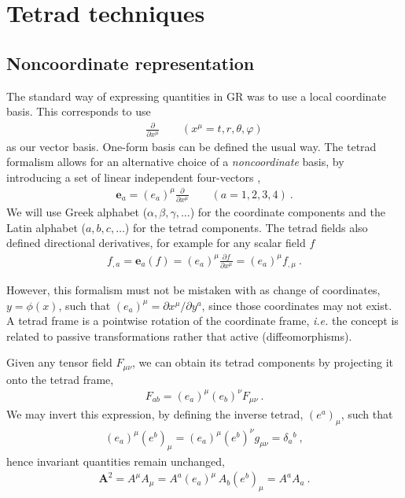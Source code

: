 
\chapter{Tetrad techniques} %
\label{AppendixTetradFormalism}


\section{Noncoordinate representation}
\label{AppendixTetradMetric}

The standard way of expressing quantities in GR was to use a local coordinate basis. This corresponds to use
\begin{align}
    \frac{\partial}{\partial x^\mu} \qquad (x^\mu = t, r, \theta, \varphi)
\end{align}
as our vector basis. One-form basis can be defined the usual way. The tetrad formalism allows for an alternative choice of a \emph{noncoordinate} basis, by introducing a set of linear independent four-vectors \cite{Wald2010, Chandrasekhar1998}, 
\begin{align}
    \bm{e}_a = (e_a)^\mu \frac{\partial}{\partial x^\mu} \qquad (a = 1, 2, 3, 4) ~.
\end{align}
We will use Greek alphabet ($\alpha,\beta,\gamma,\dots$) for the coordinate components and the Latin alphabet ($a,b,c,\dots$) for the tetrad components.
The tetrad fields also defined directional derivatives, for example for any scalar field $f$
\begin{align}
    f_{, a} = \bm{e}_a ( f ) = (e_a)^\mu \frac{\partial f}{\partial x^\mu} =  (e_a)^\mu f_{,  \mu}  ~.
\end{align}

However, this formalism must not be mistaken with as change of coordinates, $y=\phi(x)$, such that $(e_a)^\mu = \partial x^\mu / \partial y^a$, since those coordinates may not exist.
A tetrad frame is a pointwise rotation of the coordinate frame, \emph{i.e.} the concept is related to passive transformations rather that active (diffeomorphisms).

Given any tensor field $F_{\mu\nu}$, we can obtain its tetrad components by projecting it onto the tetrad frame,
\begin{align}
    F_{ab} = (e_a)^\mu (e_b)^\nu F_{\mu\nu} ~.
\end{align}
We may invert this expression, by defining the inverse tetrad, $(e^a)_\mu$, such that
\begin{align}
    (e_a)^\mu (e^b)_\mu = (e_a)^\mu (e^b)^\nu g_{\mu\nu} = \delta_a{}^b ~,
\end{align}
hence invariant quantities remain unchanged,
\begin{align}
    \bm{A}^2 = A^\mu A_\mu = A^a (e_a)^\mu \, A_b (e^b)_\mu = A^a A_a~.
\end{align}

